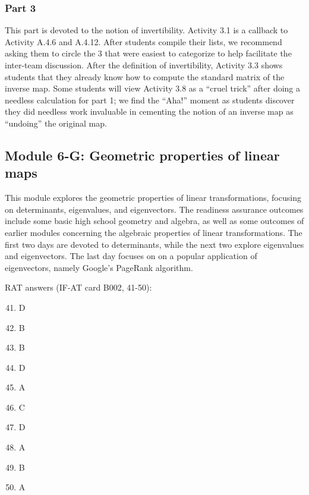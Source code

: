\documentclass{article}
\begin{document}
\subsubsection*{Part 3}
This part is devoted to the notion of invertibility.  Activity 3.1 is a callback to Activity A.4.6 and A.4.12.  After students compile their lists, we recommend asking them to circle the 3 that were easiest to categorize to help facilitate the inter-team discussion.   After the definition of invertibility, Activity 3.3 shows students that they already know how to compute the standard matrix of the inverse map.  Some students will view Activity 3.8 as a ``cruel trick'' after doing a needless calculation for part 1; we find the ``Aha!'' moment as students discover they did needless work invaluable in cementing the notion of an inverse map as ``undoing'' the original map.

\subsection*{Module 6-G: Geometric properties of linear maps}

This module explores the geometric properties of linear transformations, focusing on determinants, eigenvalues, and eigenvectors.  The readiness assurance outcomes include some basic high school geometry and algebra, as well as some outcomes of earlier modules concerning the algebraic properties of linear transformations.  The first two days are devoted to determinants, while the next two explore eigenvalues and eigenvectors.  The last day focuses on on a popular application of eigenvectors, namely Google's PageRank algorithm.

RAT answers (IF-AT card B002, 41-50):
\begin{multicols}{10}
\begin{enumerate}[1)]
\setcounter{enumi}{40}
\item D
\item B
\item B
\item D
\item A
\item C
\item D
\item A
\item B
\item A
\end{enumerate}
\end{multicols}
\end{document}
